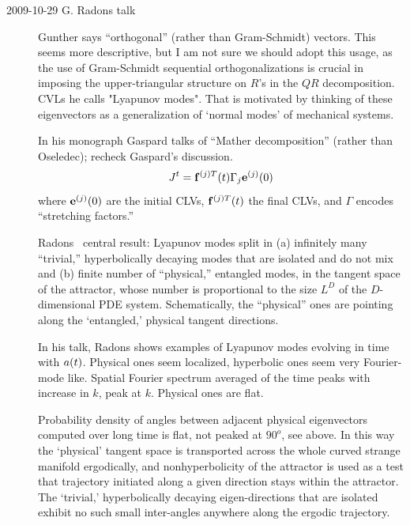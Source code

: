\begin{description}
\item[2009-10-29 G. Radons talk]  Gunther says ``orthogonal''
(rather than Gram-Schmidt) vectors. This seems more
descriptive, but I am not sure we should adopt this usage, as
the use of Gram-Schmidt sequential orthogonalizations is
crucial in imposing the upper-triangular structure on $R$'s in
the $QR$ decomposition. CVLs he calls "Lyapunov modes". That is
motivated by thinking of these eigenvectors as a generalization
of `normal modes' of mechanical systems.

In his monograph Gaspard talks of ``Mather
decomposition'' (rather than Oseledec); recheck Gaspard's
discussion.
\[
J^t = {\bf f}^{(j)T}(t) \Gamma_j {\bf e}^{(j)}(0)
\]
where ${\bf e}^{(j)}(0)$ are the initial CLVs, ${\bf
f}^{(j)T}(t)$ the final CLVs, and $\Gamma$ encodes
``stretching factors.''

Radons \etal\ central result: Lyapunov modes split in (a)
infinitely many ``trivial,'' hyperbolically decaying modes that
are isolated and do not mix and (b) finite number of
``physical,'' entangled modes, in the tangent space of the
attractor, whose number is proportional to the size $L^D$ of
the $D$-dimensional PDE system. Schematically, the ``physical''
ones are pointing along the `entangled,' physical tangent
directions.

In his talk, Radons shows examples of Lyapunov modes evolving
in time with $a(t)$. Physical ones seem localized,
hyperbolic ones seem very Fourier-mode like. Spatial Fourier
spectrum averaged of the time peaks with increase in $k$, peak
at $k$. Physical ones are flat.

Probability density of angles between adjacent physical
eigenvectors computed over long time is flat, not peaked at
$90^o$, see  above. In this way the
`physical' tangent space is transported across the whole curved
strange manifold ergodically, and nonhyperbolicity of the
attractor is used as a test that trajectory initiated along a
given direction stays within the attractor. The `trivial,'
hyperbolically decaying eigen-directions that are isolated
exhibit no such small inter-angles anywhere along the ergodic
trajectory.


\end{description}
